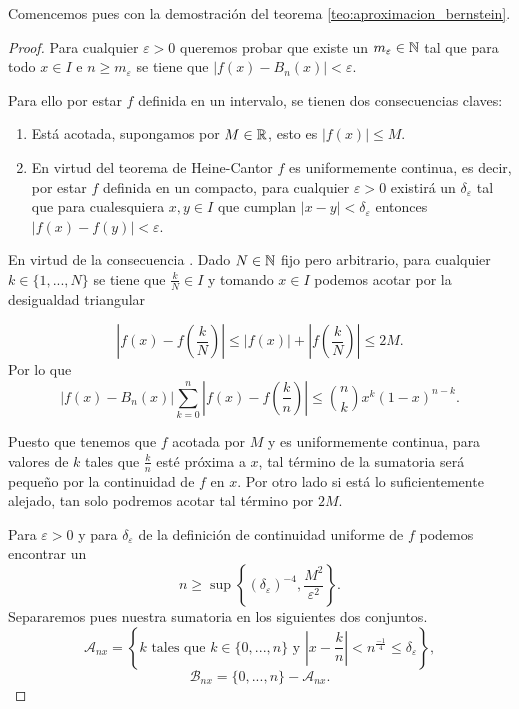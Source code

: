 Comencemos pues con la demostración del teorema \ref{teo:aproximacion_bernstein}.
\begin{proof}
    
    Para cualquier $\varepsilon > 0$ queremos probar que existe un $m_\varepsilon  \in \mathbb{N}$ tal que para 
    todo $x \in I$ e $n \geq m_\varepsilon$  se tiene que 
    $|f(x) - B_n(x)| < \varepsilon$.
    
     Para ello por estar $f$ definida en un intervalo, 
    se tienen dos consecuencias claves: 
    \begin{enumerate}
        \item Está acotada, supongamos por $M \in \mathbb{R}$, esto es $|f(x)| \leq M$. \label{consecuencia:M}
        \item En virtud del teorema de Heine-Cantor $f$ es uniformemente continua, es decir, por estar $f$ definida en un compacto,  para cualquier $\varepsilon >0$ existirá un $\delta_\varepsilon$
        tal que para cualesquiera $x,y \in I$ que cumplan $|x-y| < \delta_\varepsilon$ entonces $|f(x)-f(y)| < \varepsilon$. \label{consecuencia:delta}
    \end{enumerate}
    En virtud de la consecuencia . 
    Dado $N \in  \mathbb{N}$ fijo pero arbitrario, para cualquier $k \in \{1, ..., N\}$ se tiene que
    $\frac{k}{N} \in I$ y tomando $x \in I$ podemos acotar por la desigualdad triangular

    $$\left|f(x)- f\left( \frac{k}{N} \right) \right| \leq |f(x)| + \left|f \left( \frac{k}{N}\right) \right|\leq 2M.$$  
    Por lo que 
    \begin{equation*}
        |f(x)-B_n(x)| \sum_{k=0}^n \left|f(x) - f \left( \frac{k}{n} \right)\right| \leq
     \binom{n}{k} x^{k} (1-x)^{n-k}.
    \end{equation*}

    Puesto que tenemos que $f$ acotada por $M$ y es uniformemente continua, para valores de $k$ tales que $\frac{k}{n}$ 
    esté próxima a $x$, tal término de la sumatoria será pequeño por la continuidad de $f$ en $x$. Por otro lado
    si está lo suficientemente alejado, tan solo podremos acotar tal término por $2M$.  

    Para $\varepsilon > 0$ y para $\delta_\varepsilon$ de la definición de continuidad uniforme de $f$ 
    podemos encontrar un 
    \begin{equation} \label{eq:cota-de-la-n}
        n \geq \sup \left\{ (\delta_\varepsilon)^{-4}, \frac{M^2}{ \varepsilon^2}\right\}.
    \end{equation}
    Separaremos pues nuestra sumatoria en los siguientes dos conjuntos. 
    \begin{equation}
        \mathcal{A}_{n x} = \left\{ k \text{ tales que } k \in \{0,..., n\} \text{ y  } \left|x - \frac{k}{n}\right| < n^{\frac{-1}{4}} \leq \delta_\varepsilon \right\},
    \end{equation}
    \begin{equation}
        \mathcal{B}_{n x} = \{0,..., n\} - \mathcal{A}_{n x}. 
    \end{equation}


\end{proof}
